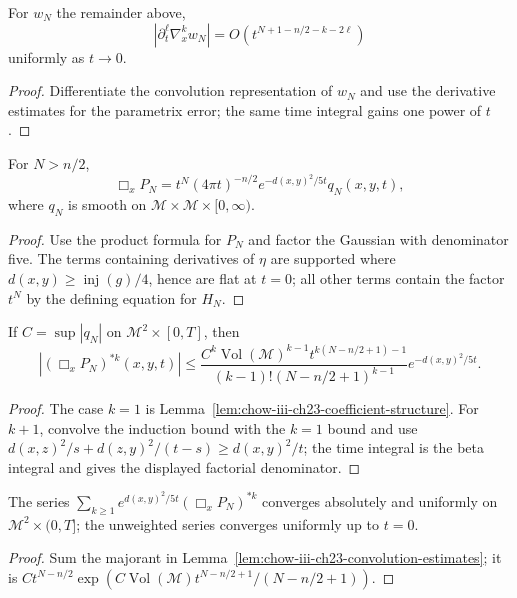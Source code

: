 \begin{example}
\label{ex:chow-iii-ch23-expansion-derivatives}
For $w_N$ the remainder above,
\[
|\partial_t^\ell\nabla_x^kw_N|=O(t^{N+1-n/2-k-2\ell})
\]
uniformly as $t\to0$.
\end{example}
\begin{proof}
Differentiate the convolution representation of $w_N$ and use the derivative
estimates for the parametrix error; the same time integral gains one power of
$t$.
\end{proof}

\begin{lemma}
\label{lem:chow-iii-ch23-coefficient-structure}
For $N>n/2$,
\[
\Box_xP_N=t^N(4\pi t)^{-n/2}e^{-d(x,y)^2/5t}q_N(x,y,t),
\]
where $q_N$ is smooth on $\mathcal M\times\mathcal M\times[0,\infty)$.
\end{lemma}
\begin{proof}
Use the product formula for $P_N$ and factor the Gaussian with denominator five.
The terms containing derivatives of $\eta$ are supported where
$d(x,y)\ge\operatorname{inj}(g)/4$, hence are flat at $t=0$; all other terms
contain the factor $t^N$ by the defining equation for $H_N$.
\end{proof}

\begin{lemma}
\label{lem:chow-iii-ch23-convolution-estimates}
If $C=\sup|q_N|$ on $\mathcal M^2\times[0,T]$, then
\[
|(\Box_xP_N)^{*k}(x,y,t)|\le
\frac{C^k\operatorname{Vol}(\mathcal M)^{k-1}t^{k(N-n/2+1)-1}}
 {(k-1)!(N-n/2+1)^{k-1}}e^{-d(x,y)^2/5t}.
\]
\end{lemma}
\begin{proof}
The case $k=1$ is Lemma~\ref{lem:chow-iii-ch23-coefficient-structure}.  For
$k+1$, convolve the induction bound with the $k=1$ bound and use
\(d(x,z)^2/s+d(z,y)^2/(t-s)\ge d(x,y)^2/t\); the time integral is the beta
integral and gives the displayed factorial denominator.
\end{proof}

\begin{corollary}
\label{cor:chow-iii-ch23-convolution-series}
The series $\sum_{k\ge1}e^{d(x,y)^2/5t}(\Box_xP_N)^{*k}$ converges absolutely and
uniformly on $\mathcal M^2\times(0,T]$; the unweighted series converges uniformly
up to $t=0$.
\end{corollary}
\begin{proof}
Sum the majorant in Lemma~\ref{lem:chow-iii-ch23-convolution-estimates}; it is
\(Ct^{N-n/2}\exp(C\operatorname{Vol}(\mathcal M)t^{N-n/2+1}/(N-n/2+1))\).
\end{proof}

